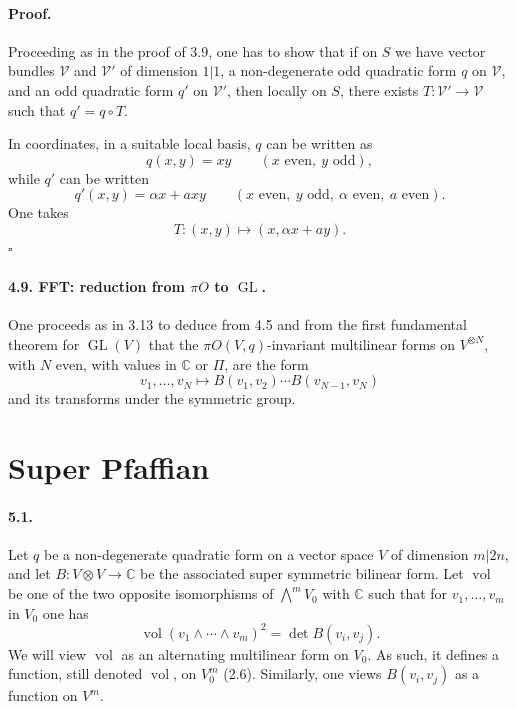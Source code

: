 \documentclass[11pt]{article}
\newcommand{\C}{\mathbb C}
\newcommand{\GL}{\operatorname{GL}}
\begin{document}
\paragraph{Proof.}
Proceeding as in the proof of 3.9, one has to show that if on $S$ we have vector bundles $\mathcal V$ and $\mathcal V'$ of dimension $1|1$, a non-degenerate odd quadratic form $q$ on $\mathcal V$, and an odd quadratic form $q'$ on $\mathcal V'$, then locally on $S$, there exists $T:\mathcal V'\to\mathcal V$ such that $q'=q\circ T$.

In coordinates, in a suitable local basis, $q$ can be written as
\[
q(x,y)=xy\qquad (x\text{ even},\ y\text{ odd}),
\]
while $q'$ can be written
\[
q'(x,y)=\alpha x+axy\qquad (x\text{ even},\ y\text{ odd},\ \alpha\text{ even},\ a\text{ even}).
\]
One takes
\[
T:(x,y)\longmapsto (x,\alpha x+ay).
\]
\hfill $\square$

\paragraph{4.9. FFT: reduction from $\pi O$ to $\GL$.}
One proceeds as in 3.13 to deduce from 4.5 and from the first fundamental theorem for $\GL(V)$ that the $\pi O(V,q)$-invariant multilinear forms on $V^{\otimes N}$, with $N$ even, with values in $\C$ or $\Pi$, are the form
\[
v_1,\ldots,v_N\longmapsto B(v_1,v_2)\cdots B(v_{N-1},v_N)
\]
and its transforms under the symmetric group.

\section{Super Pfaffian}

\paragraph{5.1.}
Let $q$ be a non-degenerate quadratic form on a vector space $V$ of dimension $m|2n$, and let $B:V\otimes V\to\C$ be the associated super symmetric bilinear form. Let $\operatorname{vol}$ be one of the two opposite isomorphisms of $\bigwedge^m V_0$ with $\C$ such that for $v_1,\ldots,v_m$ in $V_0$ one has
\begin{equation}
\label{eq:511}
\operatorname{vol}(v_1\wedge\cdots\wedge v_m)^2=\det B(v_i,v_j).
\end{equation}
We will view $\operatorname{vol}$ as an alternating multilinear form on $V_0$. As such, it defines a function, still denoted $\operatorname{vol}$, on $V_0^m$ (2.6). Similarly, one views $B(v_i,v_j)$ as a function on $V^m$.
\end{document}
